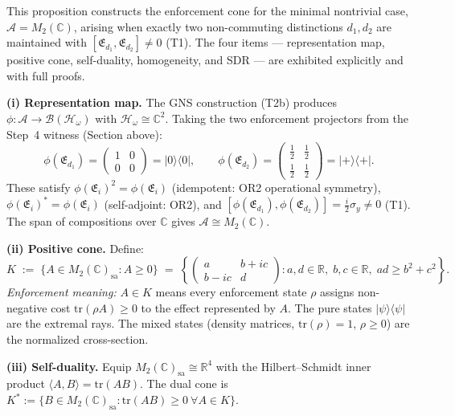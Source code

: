 \documentclass[11pt]{article}
\theoremstyle{remark}
\begin{document}
This proposition constructs the enforcement cone for the minimal nontrivial case, $\mathcal{A} = M_2(\mathbb{C})$, arising when exactly two non-commuting distinctions $d_1, d_2$ are maintained with $[\mathfrak{E}_{d_1}, \mathfrak{E}_{d_2}] \neq 0$ (T1).  The four items --- representation map, positive cone, self-duality, homogeneity, and SDR --- are exhibited explicitly and with full proofs.

\smallskip\noindent\textbf{(i) Representation map.}  The GNS construction (T2b) produces $\phi: \mathcal{A} \to \mathcal{B}(\mathcal{H}_\omega)$ with $\mathcal{H}_\omega \cong \mathbb{C}^2$.  Taking the two enforcement projectors from the Step~4 witness (Section above):
\[
\phi(\mathfrak{E}_{d_1}) = \begin{pmatrix} 1 & 0 \\ 0 & 0 \end{pmatrix} = |0\rangle\langle 0|, \qquad
\phi(\mathfrak{E}_{d_2}) = \begin{pmatrix} \tfrac{1}{2} & \tfrac{1}{2} \\ \tfrac{1}{2} & \tfrac{1}{2} \end{pmatrix} = |{+}\rangle\langle{+}|.
\]
These satisfy $\phi(\mathfrak{E}_i)^2 = \phi(\mathfrak{E}_i)$ (idempotent: OR2 operational symmetry), $\phi(\mathfrak{E}_i)^* = \phi(\mathfrak{E}_i)$ (self-adjoint: OR2), and $[\phi(\mathfrak{E}_{d_1}), \phi(\mathfrak{E}_{d_2})] = \tfrac{i}{2}\sigma_y \neq 0$ (T1).  The span of compositions over $\mathbb{C}$ gives $\mathcal{A} \cong M_2(\mathbb{C})$.

\smallskip\noindent\textbf{(ii) Positive cone.}  Define:
\[
K \;:=\; \bigl\{A \in M_2(\mathbb{C})_{\mathrm{sa}} : A \ge 0\bigr\}
\;=\; \left\{ \begin{pmatrix} a & b{+}ic \\ b{-}ic & d \end{pmatrix} : a,d \in \mathbb{R},\; b,c \in \mathbb{R},\; ad \ge b^2{+}c^2 \right\}.
\]
\textit{Enforcement meaning:} $A \in K$ means every enforcement state $\rho$ assigns non-negative cost $\mathrm{tr}(\rho A) \ge 0$ to the effect represented by $A$.  The pure states $|\psi\rangle\langle\psi|$ are the extremal rays.  The mixed states (density matrices, $\mathrm{tr}(\rho)=1$, $\rho \ge 0$) are the normalized cross-section.

\smallskip\noindent\textbf{(iii) Self-duality.}  Equip $M_2(\mathbb{C})_{\mathrm{sa}} \cong \mathbb{R}^4$ with the Hilbert--Schmidt inner product $\langle A, B \rangle = \mathrm{tr}(AB)$.  The dual cone is $K^* := \{B \in M_2(\mathbb{C})_{\mathrm{sa}} : \mathrm{tr}(AB) \ge 0\ \forall A \in K\}$.
\end{document}
